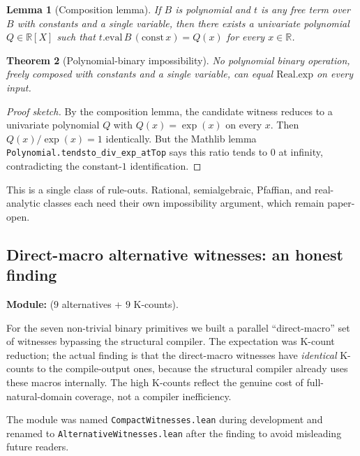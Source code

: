 \documentclass[11pt,a4paper]{article}
\theoremstyle{plain}
\newtheorem{theorem}{Theorem}[section]
\newtheorem{lemma}[theorem]{Lemma}
\theoremstyle{definition}
\newcommand{\R}{\mathbb{R}}
\begin{document}
\begin{lemma}[Composition lemma]
If $B$ is polynomial and $t$ is any free term over $B$ with constants
and a single variable, then there exists a univariate polynomial
$Q \in \R[X]$ such that $t.\mathrm{eval}\,B\,(\mathrm{const}\,x) =
Q(x)$ for every $x \in \R$.
\end{lemma}

\begin{theorem}[Polynomial-binary impossibility]
\label{thm:polybinary}
No polynomial binary operation, freely composed with constants and a
single variable, can equal $\mathrm{Real.exp}$ on every input.
\end{theorem}

\begin{proof}[Proof sketch]
By the composition lemma, the candidate witness reduces to a
univariate polynomial $Q$ with $Q(x) = \exp(x)$ on every $x$. Then
$Q(x) / \exp(x) = 1$ identically. But the Mathlib lemma
\texttt{Polynomial.\allowbreak tendsto\_div\_exp\_atTop} says this
ratio tends to $0$ at infinity, contradicting the constant-$1$
identification.
\end{proof}

This is a single class of rule-outs. Rational, semialgebraic, Pfaffian,
and real-analytic classes each need their own impossibility argument,
which remain paper-open.

\subsection{Direct-macro alternative witnesses: an honest finding}

\noindent\textbf{Module:} 
($9$ alternatives + $9$ K-counts).

For the seven non-trivial binary primitives we built a parallel
``direct-macro'' set of witnesses bypassing the structural compiler.
The expectation was K-count reduction; the actual finding is that the
direct-macro witnesses have \emph{identical} K-counts to the
compile-output ones, because the structural compiler already uses
these macros internally. The high K-counts reflect the genuine cost
of full-natural-domain coverage, not a compiler inefficiency.

The module was named \texttt{CompactWitnesses.lean} during development
and renamed to \texttt{AlternativeWitnesses.lean} after the finding to
avoid misleading future readers.

\end{document}
